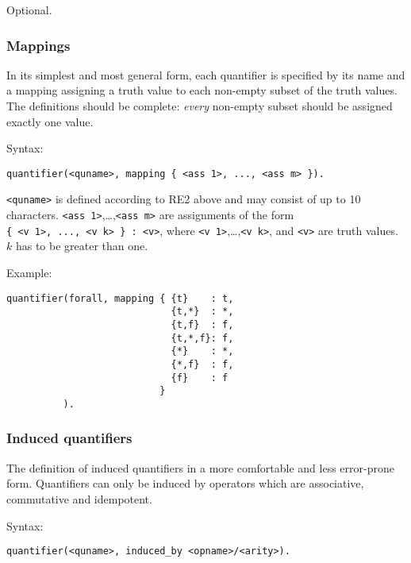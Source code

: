 \documentclass[]{article}
\begin{document}
Optional.

\hypertarget{mappings-1}{%
\subsubsection{Mappings}\label{mappings-1}}

In its simplest and most general form, each quantifier is specified by
its name and a mapping assigning a truth value to each non-empty subset
of the truth values. The definitions should be complete: \emph{every}
non-empty subset should be assigned exactly one value.

Syntax:

\begin{verbatim}
quantifier(<quname>, mapping { <ass 1>, ..., <ass m> }).
\end{verbatim}

\texttt{\textless{}quname\textgreater{}} is defined according to RE2
above and may consist of up to 10 characters.
\texttt{\textless{}ass\ 1\textgreater{}},\ldots{},\texttt{\textless{}ass\ m\textgreater{}}
are assignments of the form
\texttt{\{\ \textless{}v\ 1\textgreater{},\ ...,\ \textless{}v\ k\textgreater{}\ \}\ :\ \textless{}v\textgreater{}},
where
\texttt{\textless{}v\ 1\textgreater{}},\ldots{},\texttt{\textless{}v\ k\textgreater{}},
and \texttt{\textless{}v\textgreater{}} are truth values. \(k\) has to
be greater than one.

Example:

\begin{verbatim}
quantifier(forall, mapping { {t}    : t,
                             {t,*}  : *,
                             {t,f}  : f,
                             {t,*,f}: f,
                             {*}    : *,
                             {*,f}  : f,
                             {f}    : f
                           }
          ).
\end{verbatim}

\hypertarget{induced-quantifiers}{%
\subsubsection{Induced quantifiers}\label{induced-quantifiers}}

The definition of induced quantifiers in a more comfortable and less
error-prone form. Quantifiers can only be induced by operators which are
associative, commutative and idempotent.

Syntax:

\begin{verbatim}
quantifier(<quname>, induced_by <opname>/<arity>).
\end{verbatim}
\end{document}
